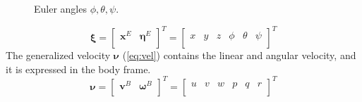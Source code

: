\documentclass[journal]{IEEEtran}
\begin{document}
	\begin{figure}[h]
		\centering
		
		
		
		\caption{Euler angles $\phi, \theta, \psi$.}
		\label{fig:roll_pitch_yaw}
	\end{figure}

	\begin{equation} \label{eq:pos}
	\bm{\xi} = \left[ \begin{array}{cc}
	\bm{x}^E & \bm{\eta}^E \\
	\end{array}\right]^T = \left[ \begin{array}{cccccc}
	x & y & z & \phi & \theta & \psi\\
	\end{array}\right] ^T
	\end{equation}  
	The generalized velocity $\bm{\nu}$ (\ref{eq:vel}) contains the linear and angular velocity, and it is expressed in the body frame.
	\begin{equation} \label{eq:vel}
	\bm{\nu} = \left[ \begin{array}{cc}
	\bm{v}^B & \bm{\omega}^B \\
	\end{array}\right]^T = \left[ \begin{array}{cccccc}
	u & v & w & p & q & r\\
	\end{array}\right] ^T 
	\end{equation}
	
\end{document}
